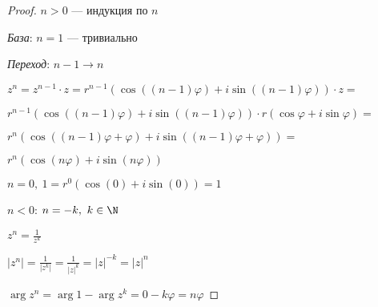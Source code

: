 \begin{proof}

    $n > 0$ --- индукция по $n$

    \textsl{База}: $n = 1$ --- тривиально
    
    \textsl{Переход}: $n - 1 \to n$
    
    $z^n = z^{n-1} \cdot z = r^{n-1}(\cos((n-1)\varphi) + i\sin((n-1)\varphi)) \cdot z = $
    
    $r^{n-1}(\cos((n-1)\varphi) + i\sin((n-1)\varphi)) \cdot r(\cos\varphi + i\sin\varphi) = $
    
    $r^n(\cos((n-1)\varphi + \varphi) + i\sin((n-1)\varphi + \varphi)) = $
    
    $r^n(\cos(n\varphi) + i\sin(n\varphi))$

    $n = 0,~ 1 = r^0(\cos(0) + i\sin(0)) = 1$

    $n < 0$: $n = -k,~k \in \N$

    $z^n = \frac{1}{z^k}$
    
    $|z^n| = \frac{1}{|z^k|} = \frac{1}{|z|^k} = |z|^{-k} = |z|^n$
    
    $\arg z^n = \arg 1 - \arg z^k = 0 - k \varphi = n \varphi$
\end{proof}